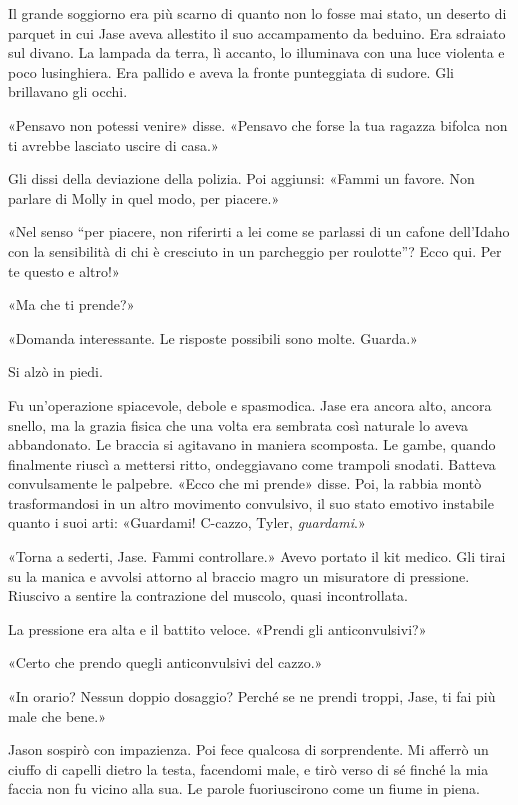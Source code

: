 Il grande soggiorno era più scarno di quanto non lo fosse mai stato, un
deserto di parquet in cui Jase aveva allestito il suo accampamento da
beduino. Era sdraiato sul divano. La lampada da terra, lì accanto, lo
illuminava con una luce violenta e poco lusinghiera. Era pallido e aveva
la fronte punteggiata di sudore. Gli brillavano gli occhi.

«Pensavo non potessi venire» disse. «Pensavo che forse la tua ragazza
bifolca non ti avrebbe lasciato uscire di casa.»

Gli dissi della deviazione della polizia. Poi aggiunsi: «Fammi un
favore. Non parlare di Molly in quel modo, per piacere.»

«Nel senso ``per piacere, non riferirti a lei come se parlassi di un
cafone dell'Idaho con la sensibilità di chi è cresciuto in un parcheggio
per roulotte''? Ecco qui. Per te questo e altro!»

«Ma che ti prende?»

«Domanda interessante. Le risposte possibili sono molte. Guarda.»

Si alzò in piedi.

Fu un'operazione spiacevole, debole e spasmodica. Jase era ancora alto,
ancora snello, ma la grazia fisica che una volta era sembrata così
naturale lo aveva abbandonato. Le braccia si agitavano in maniera
scomposta. Le gambe, quando finalmente riuscì a mettersi ritto,
ondeggiavano come trampoli snodati. Batteva convulsamente le palpebre.
«Ecco che mi prende» disse. Poi, la rabbia montò trasformandosi in un
altro movimento convulsivo, il suo stato emotivo instabile quanto i suoi
arti: «Guardami! C-cazzo, Tyler, \emph{guardami}.»

«Torna a sederti, Jase. Fammi controllare.» Avevo portato il kit medico.
Gli tirai su la manica e avvolsi attorno al braccio magro un misuratore
di pressione. Riuscivo a sentire la contrazione del muscolo, quasi
incontrollata.

La pressione era alta e il battito veloce. «Prendi gli anticonvulsivi?»

«Certo che prendo quegli anticonvulsivi del cazzo.»

«In orario? Nessun doppio dosaggio? Perché se ne prendi troppi, Jase, ti
fai più male che bene.»

Jason sospirò con impazienza. Poi fece qualcosa di sorprendente. Mi
afferrò un ciuffo di capelli dietro la testa, facendomi male, e tirò
verso di sé finché la mia faccia non fu vicino alla sua. Le parole
fuoriuscirono come un fiume in piena.

